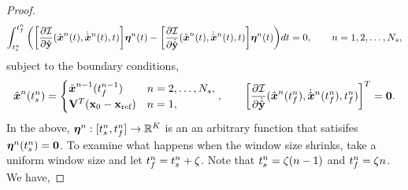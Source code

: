 \begin{proof}
\begin{equation*}
 \int_{\timeStartArg{n}}^{\timeEndArg{n}} \bigg( \bigg[ \frac{\partial \minintegrandArg{n}  }{\partial \genstateyDiscrete }(\genstateArg{n}{t},\genstateDotArg{n}{t},t) \bigg]  \variationArgntt{n}{t}  - \bigg[ \frac{\partial \minintegrandArg{n}}{\partial \genstateyDiscreteDot} (\genstateArg{n}{t},\genstateDotArg{n}{t},t ) \bigg] \variationArgntt{n}{t} \bigg)dt  = 0, \qquad n = 1,2,\ldots,\nslabs,
\end{equation*}
subject to the boundary conditions,
\begin{equation*}
 \genstate^n(\timeStartArg{n})  = 
\begin{cases}
\genstate^{n-1}(\timeEndArg{n-1}) & n=2,\ldots,\nslabs, \\
\genstateIC & n=1, \end{cases}, \qquad 
\bigg[\frac{\partial \minintegrandArg{n}}{\partial \dot{\genstateyDiscrete}}(\genstateArg{n}{\timeEndArg{n}},\genstateDotArg{n}{\timeEndArg{n}},\timeEndArg{n}) \bigg]^T= \boldsymbol 0.
\end{equation*}
In the above, $\variationArgn{n}: [\timeStartArg{n},\timeEndArg{n}] \rightarrow \RR{\romdim}$ is an an arbitrary function that satisifes $\variationArgntt{n}{\timeStartArg{n}} = \bz$. 
To examine what happens when the window size shrinks, take a uniform window size and let $\timeEndArg{n} = \timeStartArg{n} + \zeta$. Note that $\timeStartArg{n} = \zeta (n-1)$ and $\timeEndArg{n} = \zeta n$. We have, 

\end{proof}
